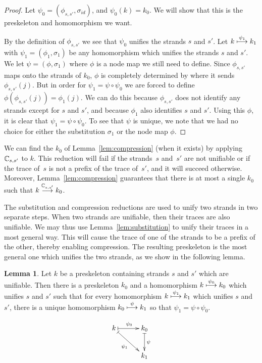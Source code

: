 \documentclass[12pt]{article}
\theoremstyle{definition}
\newtheorem{lem}[thm]{Lemma}
\begin{document}
\begin{proof}
Let $\psi_0=(\phi_{s,s'},\sigma_{id})$, and $\psi_0(k)=k_0$. We will
show that this is the preskeleton and homomorphism we want.

By the definition of $\phi_{s,s'}$ we see that $\psi_0$ unifies the
strands $s$ and $s'$.  Let $k\stackrel{\psi_1}{\longmapsto}k_1$ with
$\psi_1=(\phi_1,\sigma_1)$ be any homomorphism
which unifies the strands $s$ and $s'$. We
let $\psi=(\phi,\sigma_1)$ where $\phi$ is a node map we still need to define.
Since $\phi_{s,s'}$ maps onto the strands of $k_0$, $\phi$ is completely
determined by where it sends $\phi_{s,s'}(j)$.  But in order for
$\psi_1=\psi\circ\psi_0$ we are forced to define
$\phi(\phi_{s,s'}(j))=\phi_1(j)$.  We can do this because $\phi_{s,s'}$
does not identify any strands except for $s$ and $s'$, and because $\phi_1$
also identifies $s$ and $s'$.  Using this $\phi$, it is clear that
$\psi_1=\psi\circ\psi_0$.  To see that $\psi$ is unique, we note that we
had no choice for either the substitution $\sigma_1$ or the node map
$\phi$.
\end{proof}

We can find the $k_0$ of Lemma~\ref{lem:compression} (when it exists)
by applying $\mathbb C_{s,s'}$ to $k$.  This reduction will fail if
the strands~$s$ and~$s'$ are not unifiable or if the trace of~$s$ is
not a prefix of the trace of~$s'$, and it will succeed otherwise.
Moreover, Lemma~\ref{lem:compression} guarantees that there is at most
a single $k_0$ such that $k\stackrel{\mathbb C_{s,s'}}{\longrightarrow}k_0$.

The substitution and compression reductions are used to unify two
strands in two separate steps.  When two strands are unifiable, then
their traces are also unifiable.  We may thus use Lemma~\ref{lem:substitution}
to unify their traces in a most general way.  This will cause the trace
of one of the strands to be a prefix of the other, thereby enabling
compression.  The resulting preskeleton is the most general one which
unifies the two strands, as we show in the following lemma.

\begin{lem}\label{lem:hulling}
Let $k$ be a preskeleton containing strands $s$ and $s'$
which are unifiable.
Then there is a preskeleton $k_0$ and a homomorphism
$k\stackrel{\psi_0}{\longmapsto}k_0$ which unifies $s$ and $s'$ such that
for every homomorphism $k\stackrel{\psi_1}{\longmapsto}k_1$ which unifies
$s$ and $s'$, there is a unique homomorphism
$k_0\stackrel{\psi}{\longmapsto}k_1$ so that $\psi_1=\psi\circ\psi_0$.

$$\xymatrix@C=3em{
k\ar@{|->}[r]^{\psi_0} \ar@{|->}[rd]_{\psi_1} &
k_0 \ar@{|->}[d]^{\psi}\\
&k_1}$$
\end{lem}
\end{document}
